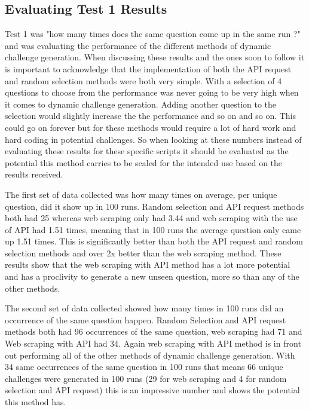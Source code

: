 \documentclass[12pt,a4paper]{article}
\begin{document}
\subsection{Evaluating Test 1 Results}   
Test 1 was "how many times does the same question come up in the same run ?" and was evaluating the performance of the different methods of dynamic challenge generation. When discussing these results and the ones soon to follow it is important to acknowledge that the implementation of both the API request and random selection methods were both very simple. With a selection of 4 questions to choose from the performance was never going to be very high when it comes to dynamic challenge generation. Adding another question to the selection would slightly increase the the performance and so on and so on. This could go on forever but for these methods would require a lot of hard work and hard coding in potential challenges. So when looking at these numbers instead of evaluating these results for these specific scripts it should be evaluated as the potential this method carries to be scaled for the intended use based on the results received.  

The first set of data collected was how many times on average, per unique question, did it show up in 100 runs. Random selection and API request methods both had 25 whereas web scraping only had 3.44 and web scraping with the use of API had 1.51 times, meaning that in 100 runs the average question only came up 1.51 times. This is significantly better than both the API request and random selection methods and over 2x better than the web scraping method. These results show that the web scraping with API method has a lot more potential and has a proclivity to generate a new unseen question, more so than any of the other methods. 

The second set of data collected showed how many times in 100 runs did an occurrence of the same question happen. Random Selection and API request methods both had 96 occurrences of the same question, web scraping had 71 and Web scraping with API had 34. Again web scraping with API method is in front out performing all of the other methods of dynamic challenge generation. With 34 same occurrences of the same question in 100 runs that means 66 unique challenges were generated in 100 runs (29 for web scraping and 4 for random selection and API request) this is an impressive number and shows the potential this method has. 
\end{document}

